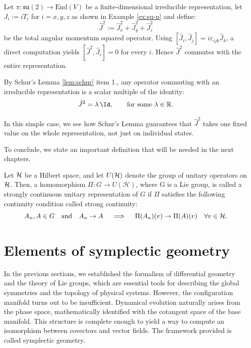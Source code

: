 \begin{example}
	Let $\pi: \mathfrak{su}(2) \to \mathrm{End}(V)$ be a finite-dimensional irreducible representation, let $J_i := i T_i$ for $i = x,y,z$ as shown in Example \ref{ex:su-n} and define:
	\[
	\hat J^2 := \hat J_x^2 + \hat J_y^2 + \hat J_z^2
	\]
	be the total angular momentum squared operator. Using $[\hat J_i, \hat J_j] = i\varepsilon_{ijk}\hat J_k$, a direct computation yields $[\hat J^2, \hat J_i] = 0$ for every $i$. Hence $\hat J^2$ commutes with the entire representation.
	
	\noindent By Schur's Lemma \ref{lem:schur} item 1., any operator commuting with an irreducible representation is a scalar multiple of the identity:
	\[
	\hat J^2 = \lambda\, \Id, \qquad \text{for some } \lambda \in \R.
	\]
	
	\noindent In this simple case, we see how Schur's Lemma guarantees that $\hat J^2$ takes one fixed value on the whole representation, not just on individual states.
\end{example}

\noindent To conclude, we state an important definition that will be needed in the next chapters.

\begin{definition} \label{def:rep-scur}
	Let $\H$ be a Hilbert space, and let $U(\H)$ denote the group of unitary operators on $\H$. Then, a homomorphism $\Pi \colon G \to U(\mathcal{H})$, where G is a Lie group, is called a strongly continuous unitary representation of $G$ if $\Pi$ satisfies the following continuity condition called strong continuity: 
	\[
 		A_n, A \in G \quad \text{and} \quad  A_n \to A \quad \implies \quad \Pi(A_n) (v) \to \Pi(A) (v) \quad \forall v \in \H.
 	\] 
\end{definition}

\section{Elements of symplectic geometry}

In the previous sections, we established the formalism of differential geometry and the theory of Lie groups, which are essential tools for describing the global symmetries and the topology of physical systems. However, the configuration manifold turns out to be insufficient. Dynamical evolution naturally arises from the phase space, mathematically identified with the cotangent space of the base manifold. This structure is complete enough to yield a way to compute an isomorphism between covectors and vector fields. The framework provided is called symplectic geometry. 

